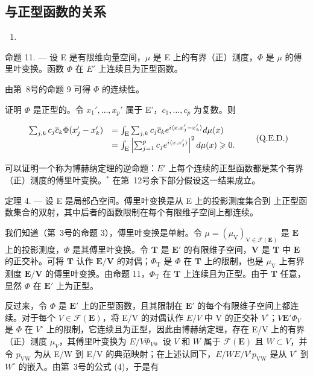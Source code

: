 \subsection{与正型函数的关系}

\begin{enumerate}
\def\labelenumi{(\arabic{enumi})}
\setcounter{enumi}{65}
\tightlist
\item
\end{enumerate}

命题 11. --- 设 E 是有限维向量空间，\(\mu\) 是 E 上的有界（正）测度，\(\Phi\) 是 \(\mu\) 的傅里叶变换。函数 \(\Phi\) 在 \(E'\) 上连续且为正型函数。

由第~8号的命题 9 可得 \(\Phi\) 的连续性。

证明 \(\Phi\) 是正型的。令 \(x_1', \ldots, x_p'\) 属于 E'，\(c_1, \ldots, c_p\) 为复数。则

\[
\begin{array}{r l} \sum_ {j, k} c _ {j} \overline {{{c}}} _ {k} \Phi (x _ {j} ^ {\prime} - x _ {k} ^ {\prime}) & = \int_ {\mathrm{E}} \sum_ {j, k} c _ {j} \overline {{{c}}} _ {k} e ^ {i \langle x, x _ {j} ^ {\prime} - x _ {k} ^ {\prime} \rangle} d \mu (x) \\ & = \int_ {\mathrm{E}} \left| \sum_ {j = 1} ^ {p} c _ {j} e ^ {i \langle x, x _ {j} ^ {\prime} \rangle} \right| ^ {2} d \mu (x) \geqslant 0. \end{array}\tag{Q.E.D.}
\]

可以证明一个称为博赫纳定理的逆命题：\(E'\) 上每个连续的正型函数都是某个有界（正）测度的傅里叶变换。\(^{*}\) 在第~12号余下部分假设这一结果成立。

定理 4. --- 设 E 是局部凸空间。傅里叶变换是从 E 上的投影测度集合到  上正型函数集合的双射，其中后者的函数限制在每个有限维子空间上都连续。

我们知道（第~3号的命题 3），傅里叶变换是单射。令 \(\mu = (\mu_{\mathrm{V}})_{\mathrm{V}\in \mathcal{F}(\mathbf{E})}\) 是 \(\mathbf{E}\) 上的投影测度，\(\Phi\) 是其傅里叶变换。令 \(\mathbf{T}\) 是 \(\mathbf{E}'\) 的有限维子空间，\(\mathbf{V}\) 是 \(\mathbf{T}\) 中 \(\mathbf{E}\) 的正交补。可将 \(\mathbf{T}\) 认作 \(\mathbf{E} / \mathbf{V}\) 的对偶；\(\Phi_{\mathrm{T}}\) 是 \(\Phi\) 在 \(\mathbf{T}\) 上的限制，也是 \(\mu_{\mathrm{V}}\) 上有界测度 \(\mathbf{E} / \mathbf{V}\) 的傅里叶变换。由命题 11，\(\Phi_{\mathrm{T}}\) 在 \(\mathbf{T}\) 上连续且为正型。由于 \(\mathbf{T}\) 任意，显然 \(\Phi\) 在 \(\mathbf{E}'\) 上为正型。

反过来，令 \(\Phi\) 是 \(\mathbf{E}'\) 上的正型函数，且其限制在 \(\mathbf{E}'\) 的每个有限维子空间上都连续。对于每个 \(V \in \mathcal{F}(\mathbf{E})\)，将 E/V 的对偶认作 \(E/V\) 中 V 的正交补 \(V^{\circ}\)；\(V\)\(\mathbf{E}'\)\(\Phi_V\) 是 \(\Phi\) 在 \(V^{\circ}\) 上的限制，它连续且为正型，因此由博赫纳定理，存在 E/V 上的有界（正）测度 \(\mu_V\)，其傅里叶变换为 \(E/V\)\(\Phi_V\)。设 \(V\) 和 \(W\) 属于 \(\mathcal{F}(\mathbf{E})\) 且 \(W \subset V\)，并令 \(p_{\mathrm{VW}}\) 为从 E/W 到 E/V 的典范映射；在上述认同下，\(E/W\)\(E/V\)\(^{t}p_{\mathrm{VW}}\) 是从 \(V^{\circ}\) 到 \(W^{\circ}\) 的嵌入。由第~3号的公式 (4)，于是有

